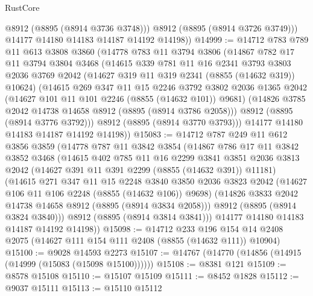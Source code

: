 \begin{lexlean}{RustCore}
\begin{coremodule}
            @8912
            (@8895 (@8914 @3736 @3748)))
          @8912
          (@8895 (@8914 @3726 @3749)))
        @14177
        @14180
        @14183
        @14187
        @14192
        @14198))
@14999 := @14712
    @783
    @789
    @11
    @613
    @3808
    @3860
    (@14778
      @783
      @11
      @3794
      @3806
      (@14867
        @782
        @17
        @11
        @3794
        @3804
        @3468
        (@14615
          @339
          @781
          @11
          @16
          @2341
          @3793
          @3803
          @2036
          @3769
          @2042
          (@14627 @319 @11 @319 @2341 (@8855 (@14632 @319)) @10624)
          (@14615
            @269
            @347
            @11
            @15
            @2246
            @3792
            @3802
            @2036
            @1365
            @2042
            (@14627 @101 @11 @101 @2246 (@8855 (@14632 @101)) @9681)
            (@14826 @3785 @2042 @14738 @14658 @8912 (@8895 (@8914 @3786 @2058)))
            @8912
            (@8895 (@8914 @3776 @3792)))
          @8912
          (@8895 (@8914 @3770 @3793)))
        @14177
        @14180
        @14183
        @14187
        @14192
        @14198))
@15083 := @14712
    @787
    @249
    @11
    @612
    @3856
    @3859
    (@14778
      @787
      @11
      @3842
      @3854
      (@14867
        @786
        @17
        @11
        @3842
        @3852
        @3468
        (@14615
          @402
          @785
          @11
          @16
          @2299
          @3841
          @3851
          @2036
          @3813
          @2042
          (@14627 @391 @11 @391 @2299 (@8855 (@14632 @391)) @11181)
          (@14615
            @271
            @347
            @11
            @15
            @2248
            @3840
            @3850
            @2036
            @3823
            @2042
            (@14627 @106 @11 @106 @2248 (@8855 (@14632 @106)) @9698)
            (@14826 @3833 @2042 @14738 @14658 @8912 (@8895 (@8914 @3834 @2058)))
            @8912
            (@8895 (@8914 @3824 @3840)))
          @8912
          (@8895 (@8914 @3814 @3841)))
        @14177
        @14180
        @14183
        @14187
        @14192
        @14198))
@15098 := @14712
    @233
    @196
    @154
    @14
    @2408
    @2075
    (@14627 @111 @154 @111 @2408 (@8855 (@14632 @111)) @10904)
@15100 := @9028 @14593 @2273
@15107 := @14767 (@14770 (@14856 (@14915 (@14999 (@15083 (@15098 @15100))))))
@15108 := @8381 @121
@15109 := @8578 @15108
@15110 := @15107 @15109
@15111 := @8452 @1828
@15112 := @9037 @15111
@15113 := @15110 @15112

\end{coremodule}
\end{lexlean}
